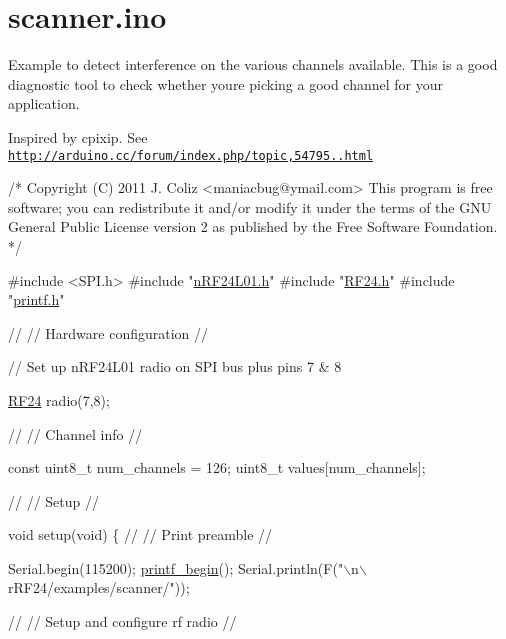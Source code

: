 \hypertarget{scanner_8ino-example}{}\section{scanner.\+ino}
Example to detect interference on the various channels available. This is a good diagnostic tool to check whether you\textquotesingle{}re picking a good channel for your application.

Inspired by cpixip. See \href{http://arduino.cc/forum/index.php/topic,54795.0.html}{\tt http\+://arduino.\+cc/forum/index.\+php/topic,54795..\+html}


\begin{DoxyCodeInclude}
\textcolor{comment}{/*}
\textcolor{comment}{ Copyright (C) 2011 J. Coliz <maniacbug@ymail.com>}
\textcolor{comment}{}
\textcolor{comment}{ This program is free software; you can redistribute it and/or}
\textcolor{comment}{ modify it under the terms of the GNU General Public License}
\textcolor{comment}{ version 2 as published by the Free Software Foundation.}
\textcolor{comment}{ */}

\textcolor{preprocessor}{#include <SPI.h>}
\textcolor{preprocessor}{#include "\hyperlink{nRF24L01_8h}{nRF24L01.h}"}
\textcolor{preprocessor}{#include "\hyperlink{RF24_8h}{RF24.h}"}
\textcolor{preprocessor}{#include "\hyperlink{printf_8h}{printf.h}"}

\textcolor{comment}{//}
\textcolor{comment}{// Hardware configuration}
\textcolor{comment}{//}

\textcolor{comment}{// Set up nRF24L01 radio on SPI bus plus pins 7 & 8}

\hyperlink{classRF24}{RF24} radio(7,8);

\textcolor{comment}{//}
\textcolor{comment}{// Channel info}
\textcolor{comment}{//}

\textcolor{keyword}{const} uint8\_t num\_channels = 126;
uint8\_t values[num\_channels];

\textcolor{comment}{//}
\textcolor{comment}{// Setup}
\textcolor{comment}{//}

\textcolor{keywordtype}{void} setup(\textcolor{keywordtype}{void})
\{
  \textcolor{comment}{//}
  \textcolor{comment}{// Print preamble}
  \textcolor{comment}{//}

  Serial.begin(115200);
  \hyperlink{printf_8h_afc0d9ca32710dff550ebe56ab6b39d23}{printf\_begin}();
  Serial.println(F(\textcolor{stringliteral}{"\(\backslash\)n\(\backslash\)rRF24/examples/scanner/"}));

  \textcolor{comment}{//}
  \textcolor{comment}{// Setup and configure rf radio}
  \textcolor{comment}{//}


\end{DoxyCodeInclude}
